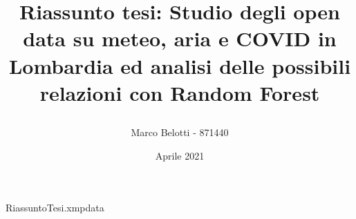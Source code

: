 \begin{filecontents*}{RiassuntoTesi.xmpdata}
\end{filecontents*}

\documentclass[a4paper]{article}

\usepackage[utf8]{inputenc}
\usepackage[english,italian]{babel}
\usepackage[hyphens]{url}


\title{Riassunto tesi: Studio degli open data su meteo, aria e COVID in Lombardia ed analisi delle possibili relazioni con Random Forest\author{Marco Belotti - 871440}\date{Aprile 2021}}


\maketitle

\section{Ente presso cui è stato svolto il lavoro di stage}
Lo stage si è svolto internamente all'Università degli Studi di Milano, con il professore Andrea Trentini.

\section{Contesto iniziale}
L'inquinamento atmosferico è sicuramente un tema molto importante e discusso all'interno della comunità scientifica, il suo impatto sulla salute umana e sull'ambiente è noto e diverse nel corso degli anni sono state le misure introdotte per regolamentare le fonti emissive e provare a contenere il problema, specie laddove la situazione risultava maggiormente critica.  

Nel corso degli ultimi 20 anni, grazie ad una serie di normative ed al progresso tecnologico che ha coinvolto tutti i settori, le concentrazioni di tutti gli inquinanti più preoccupanti come il biossido di azoto, il biossido di zolfo, il monossido di carbonio, il benzene e le polveri sottili (PM10 e PM2.5) sono calate con percentuali tra il 10\% ed il 90\%, ma per alcuni di essi, biossido di azoto e polveri sottili, rimane una certa preoccupazione a causa della potenziale pericolosità sulla salute delle concentrazioni attuali \cite{iir2020}.

